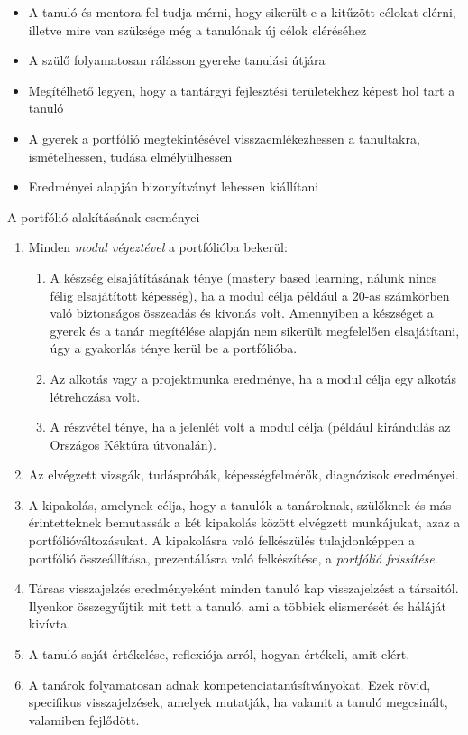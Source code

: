 \begin{itemize}
\item A tanuló és mentora fel tudja mérni, hogy sikerült-e a kitűzött célokat elérni, illetve mire van szüksége még a tanulónak új célok eléréséhez

\item A szülő folyamatosan rálásson gyereke tanulási útjára

\item Megítélhető legyen, hogy a tantárgyi fejlesztési területekhez képest hol tart a tanuló

\item A gyerek a portfólió megtekintésével visszaemlékezhessen a tanultakra, ismételhessen, tudása elmélyülhessen

\item Eredményei alapján bizonyítványt lehessen kiállítani

\end{itemize}
A portfólió alakításának eseményei
\begin{enumerate}
\item Minden \emph{modul végeztével} a portfólióba bekerül:

\begin{enumerate}

\item  A készség elsajátításának ténye (mastery based learning, nálunk nincs félig elsajátított képesség), ha a modul célja például a 20-as számkörben való biztonságos összeadás és kivonás volt. Amennyiben a készséget a gyerek és a tanár megítélése alapján nem sikerült megfelelően elsajátítani, úgy a gyakorlás ténye kerül be a portfólióba.
\item Az alkotás vagy a projektmunka eredménye, ha a modul célja egy alkotás létrehozása volt.
\item A részvétel ténye, ha a jelenlét volt a modul célja (például kirándulás az Országos Kéktúra útvonalán).


\end{enumerate}
\item Az elvégzett vizsgák, tudáspróbák, képességfelmérők, diagnózisok eredményei.

\item A kipakolás, amelynek célja, hogy a tanulók a tanároknak, szülőknek és más érintetteknek bemutassák a két kipakolás között elvégzett munkájukat, azaz a portfólióváltozásukat. A kipakolásra való felkészülés tulajdonképpen a portfólió összeállítása, prezentálásra való felkészítése, a \emph{portfólió frissítése}.

\item Társas visszajelzés eredményeként minden tanuló kap visszajelzést a társaitól. Ilyenkor összegyűjtik mit tett a tanuló, ami a többiek elismerését és háláját kivívta.

\item A tanuló saját értékelése, reflexiója arról, hogyan értékeli, amit elért.

\item A tanárok folyamatosan adnak kompetenciatanúsítványokat. Ezek rövid, specifikus visszajelzések, amelyek mutatják, ha valamit a tanuló megcsinált, valamiben fejlődött.
\end{enumerate}

